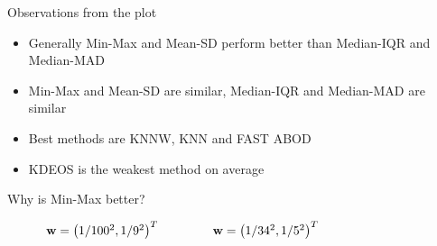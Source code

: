 \documentclass{beamer}
\begin{document}
\begin{darkframes}
    \begin{frame}{Observations from the plot}
    \begin{itemize}
        \item Generally Min-Max and Mean-SD perform better than Median-IQR and Median-MAD
        \item Min-Max and Mean-SD are similar, Median-IQR and Median-MAD are similar
        \item Best methods are KNNW, KNN and FAST ABOD
        \item KDEOS is the weakest method on average
    \end{itemize}
    \end{frame}
 		
     \begin{frame}{Why is Min-Max better?}
    \begin{figure}
    \captionsetup[subfigure]{labelformat=empty}
     \centering
	\end{figure}
	
    $\hspace{1cm} \mathbf{w} = \left( 1/100^2, 1/9^2\right )^T \hspace{1.5cm} \mathbf{w} = \left( 1/34^2, 1/5^2\right )^T $ 
    

\end{frame}
\end{darkframes}
\end{document}

